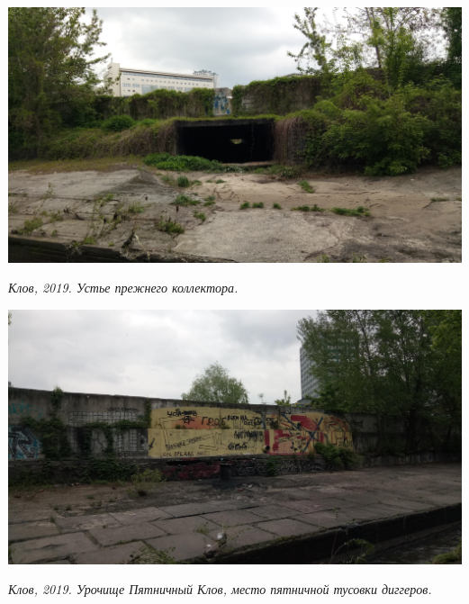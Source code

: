\vspace*{\fill}







\newpage
\vspace*{\fill}

\begin{center}
\includegraphics[width=\linewidth]{rpix/IMG_20190504_133643.jpg}

\textit{Клов, 2019. Устье прежнего коллектора.}
\end{center}


\begin{center}
\includegraphics[width=\linewidth]{rpix/IMG_20190504_133659.jpg}

\textit{Клов, 2019. Урочище Пятничный Клов, место пятничной тусовки диггеров.}
\end{center}

